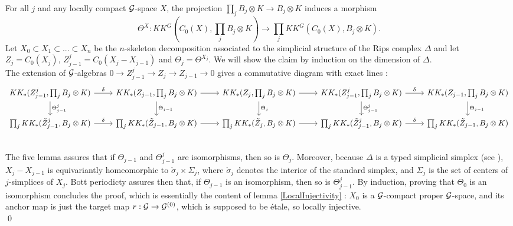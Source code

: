 \begin{dem}
For all $j$ and any locally compact $\mathcal G$-space $X$, the projection $\prod_j B_j\otimes K\rightarrow B_j \otimes K$ induces a morphism
\[\Theta^X : KK^G(C_0(X),\prod_j B_j\otimes K )\rightarrow \prod_j  KK^G(C_0(X),B_j\otimes K ).\]
Let $X_0\subset X_1 \subset ...\subset X_n$ be the $n$-skeleton decomposition associated to the simplicial structure of the Rips complex $\Delta$ and let $Z_j = C_0(X_j)$, $Z^j_{j-1} = C_0(X_j-X_{j-1})$ and $\Theta_j = \Theta^{X_j}$.
We will show the claim by induction on the dimension of $\Delta$.\\

The extension of $\mathcal G$-algebras $0\rightarrow Z^j_{j-1} \rightarrow Z_j \rightarrow Z_{j-1}\rightarrow 0$ gives a commutative diagram with exact lines :
\[\begin{tikzcd}
KK_*(Z^j_{j-1},\prod_j B_j\otimes K)\arrow{r}{\delta}\arrow{d}{\Theta^j_{j-1}} & KK_*(Z_{j-1},\prod_j B_j\otimes K)\arrow{r}\arrow{d}{\Theta_{j-1}} & KK_*(Z_j,\prod_j B_j\otimes K)\arrow{r}\arrow{d}{\Theta_j} & KK_*(Z^j_{j-1},\prod_j B_j\otimes K)\arrow{r}{\delta} \arrow{d}{\Theta^j_{j-1}} & KK_*(Z_{j-1},\prod_j B_j\otimes K)\arrow{d}{\Theta_{j-1}}\\
\prod_j KK_*(\tilde Z^j_{j-1},B_j \otimes K)\arrow{r}{\delta} & \prod_j KK_*(\tilde Z_{j-1},B_j \otimes K)\arrow{r} & \prod_j KK_*(\tilde Z_j,B_j \otimes K)\arrow{r} & \prod_j KK_*(\tilde Z^j_{j-1},B_j \otimes K)\arrow{r}{\delta} & \prod_j KK_*(\tilde Z_{j-1},B_j \otimes K)\\
\end{tikzcd}\]
The five lemma assures that if $\Theta_{j-1}$ and $\Theta^j_{j-1}$ are isomorphisms, then so is $\Theta_j$. Moreover, because $\Delta$ is a typed simplicial simplex (see \cite{TuBC2}), $X_j-X_{j-1}$ is equivariantly homeomorphic to $\mathring \sigma_j \times \Sigma_j$, where  $\mathring \sigma _ j $ denotes the interior of the standard simplex, and   $\Sigma_j$ is the set of centers of $j$-simplices of $X_j$. Bott periodicty assures then that, if $\Theta_{j-1}$ is an isomorphism, then so is $\Theta^j_{j-1}$. By induction, proving that $\Theta_0$ is an isomorphism concludes the proof, which is essentially the content of lemma \ref{LocalInjectivity} : $X_0$ is a $\mathcal G$-compact proper $\mathcal G$-space, and its anchor map is just the target map $r:\mathcal G\rightarrow \mathcal G^{(0)}$, which is supposed to be étale, so locally injective.\\
\qed
\end{dem}

